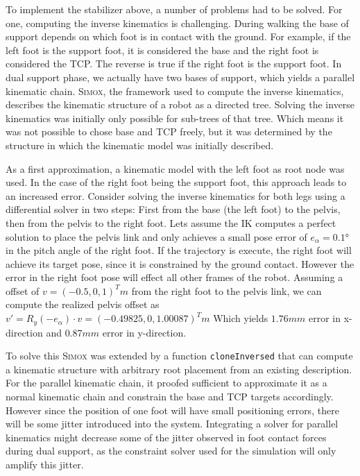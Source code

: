 \documentclass[english,ngerman]{KITreprt}
\newcommand{\name}[1]{\textsc{#1}}
\begin{document}
To implement the stabilizer above, a number of problems had to be
solved. For one, computing the inverse kinematics is challenging. During
walking the base of support depends on which foot is in contact with the
ground. For example, if the left foot is the support foot, it is
considered the base and the right foot is considered the TCP. The
reverse is true if the right foot is the support foot. In dual support
phase, we actually have two bases of support, which yields a parallel
kinematic chain. \name{Simox}, the framework used to compute the inverse
kinematics, describes the kinematic structure of a robot as a directed
tree. Solving the inverse kinematics was initially only possible for
sub-trees of that tree. Which means it was not possible to chose base
and TCP freely, but it was determined by the structure in which the
kinematic model was initially described.

As a first approximation, a kinematic model with the left foot as root
node was used. In the case of the right foot being the support foot,
this approach leads to an increased error. Consider solving the inverse
kinematics for both legs using a differential solver in two steps: First
from the base (the left foot) to the pelvis, then from the pelvis to the
right foot. Lets assume the IK computes a perfect solution to place the
pelvis link and only achieves a small pose error of $e_{\alpha} = 0.1°$
in the pitch angle of the right foot. If the trajectory is execute, the
right foot will achieve its target pose, since it is constrained by the
ground contact. However the error in the right foot pose will effect all
other frames of the robot. Assuming a offset of $v = (-0.5, 0, 1)^T m$
from the right foot to the pelvis link, we can compute the realized
pelvis offset as
$v' = R_y(-e_{\alpha}) \cdot v = (-0.49825, 0,  1.00087)^T m$ Which
yields $1.76mm$ error in x-direction and $0.87mm$ error in y-direction.

To solve this \name{Simox} was extended by a function
\texttt{cloneInversed} that can compute a kinematic structure with
arbitrary root placement from an existing description. For the parallel
kinematic chain, it proofed sufficient to approximate it as a normal
kinematic chain and constrain the base and TCP targets accordingly.
However since the position of one foot will have small positioning
errors, there will be some jitter introduced into the system.
Integrating a solver for parallel kinematics might decrease some of the
jitter observed in foot contact forces during dual support, as the
constraint solver used for the simulation will only amplify this jitter.
\end{document}
